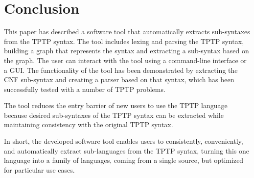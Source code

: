
\chapter{Conclusion}\label{cha:Conclusion}
This paper has described a software tool that automatically extracts sub-syntaxes from the TPTP syntax. 
The tool includes lexing and parsing the TPTP syntax, building 
a graph that represents the syntax and extracting a sub-syntax based on the graph. The user can interact with the tool using a command-line interface or a GUI.
The functionality of the tool has been demonstrated by extracting the CNF sub-syntax and creating a parser based on that syntax, which has been successfully tested with a number of TPTP problems.

The tool reduces the entry barrier of new users to use the TPTP language because desired sub-syntaxes of the TPTP syntax can be extracted while maintaining consistency with the original TPTP syntax.

In short, the developed software tool enables users to consistently, conveniently, and automatically extract sub-languages from the TPTP syntax, turning this one language into a family of languages, coming from a single source, but optimized for particular use cases.
%
%
%
%

